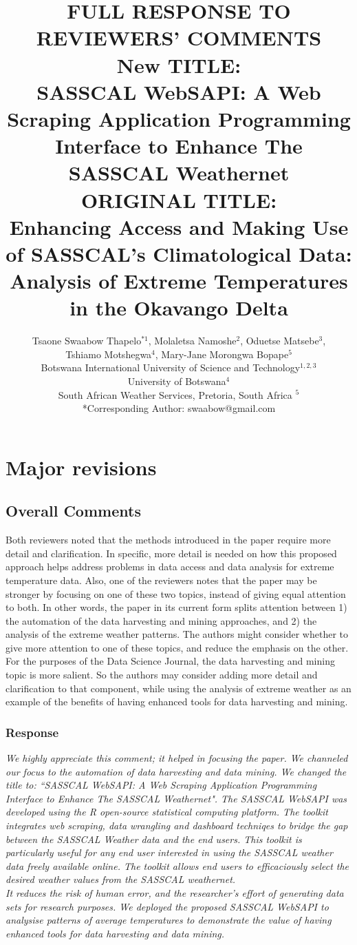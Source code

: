 \documentclass[a4paper, 12pt, conference]{ieeeconf}      %
\title{ \bf FULL RESPONSE TO REVIEWERS' COMMENTS\\
\vspace{0.3in}
New TITLE:\\
\vspace{0.1in}
SASSCAL WebSAPI: A Web Scraping Application Programming Interface to Enhance The SASSCAL Weathernet
\vspace{0.4in}\\
ORIGINAL TITLE:\\
\vspace{0.1in}
Enhancing Access and Making Use of SASSCAL’s Climatological Data: Analysis of Extreme Temperatures in the Okavango Delta
}
\author{Tsaone Swaabow Thapelo$^{*1}$,  Molaletsa Namoshe$^{2}$,  Oduetse Matsebe$^3$,\\
Tshiamo Motshegwa$^4$, Mary-Jane Morongwa Bopape$^5$  \\
	Botswana International University of Science and Technology$^{1,2,3}$\\
		University of Botswana$^4$\\
			South African Weather Services, Pretoria, South Africa $^{5}$ \\
		{*\color{black}Corresponding Author}: {\color{black}swaabow@gmail.com}
}
\begin{document}
\maketitle
\thispagestyle{empty}
\pagestyle{empty}

\onecolumn



	\section{Major revisions}
	\label{Major}
	\subsection{Overall Comments}
	\noindent
	 Both reviewers noted that the methods introduced in the paper require more detail and clarification. In specific, more detail is needed on how this proposed approach helps address problems in data access and data analysis for extreme temperature data. Also, one of the reviewers notes that the paper may be stronger by focusing on one of these two topics, instead of giving equal attention to both. In other words, the paper in its current form splits attention between 1) the automation of the data harvesting and mining approaches, and 2) the analysis of the extreme weather patterns. The authors might consider whether to give more attention to one of these topics, and reduce the emphasis on the other. For the purposes of the Data Science Journal, the data harvesting and mining topic is more salient. So the authors may consider adding more detail and clarification to that component, while using the analysis of extreme weather as an example of the benefits of having enhanced tools for data harvesting and mining.
	 \subsubsection{\textbf{Response}}
	 \label{Respo}
	\emph{ We highly appreciate this comment; it helped in focusing the paper. We channeled our focus to the  automation of  data harvesting and data mining. We changed the title to: ``SASSCAL WebSAPI: A Web Scraping Application Programming
		Interface to Enhance The SASSCAL Weathernet". The SASSCAL WebSAPI was developed using the R open-source statistical computing platform. The toolkit integrates web scraping, data wrangling and dashboard  techniqes to bridge the gap between the SASSCAL Weather data and the end users. This toolkit is particularly useful
		for any end user interested in using the SASSCAL weather data freely available online. The toolkit allows end users to efficaciously select the desired weather values from the SASSCAL weathernet.\\
		 It reduces
		the risk of human error, and the researcher's effort of
		generating data sets for research purposes.  We deployed the proposed SASSCAL WebSAPI to analysise  patterns of average temperatures  to demonstrate the value  of having enhanced tools for data harvesting and data mining.}
		
\end{document}
